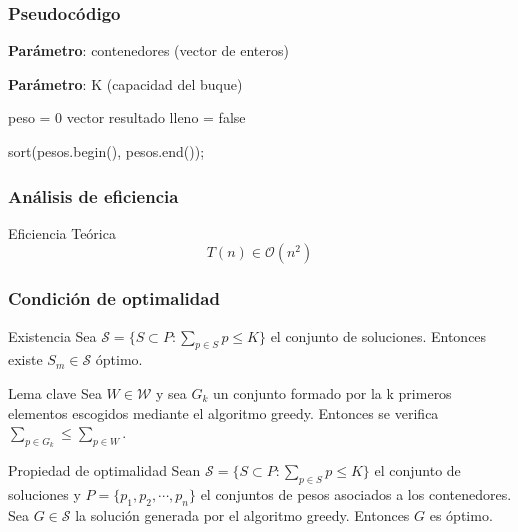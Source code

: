 \documentclass[13pt]{beamer}
\begin{document}
	\begin{frame}
		\frametitle{Pseudocódigo}
		\begin{algorithm}[H]
			\begin{minipage}{0.92\textwidth}
			\textbf{Parámetro}: contenedores (vector de enteros)
		
			\textbf{Parámetro}: K (capacidad del buque)
		
			\end{minipage}
		
			peso = 0\;
			vector resultado\;
			lleno = false\;
		
			sort(pesos.begin(), pesos.end());

			 {
			}

			
		\end{algorithm}
	\end{frame}

	\begin{frame}
		\frametitle{Análisis de eficiencia}
		\begin{block}{Eficiencia Teórica}
			$$T(n) \in \mathcal{O}(n^2)$$
		\end{block}
	\end{frame}

	\begin{frame}
		\frametitle{Condición de optimalidad}

		\begin{block}{Existencia}
			Sea $\mathcal{S} = \{S \subset P : \sum_{p \in S} p \leq K\}$ el conjunto de soluciones. Entonces
			existe $S_m \in \mathcal S$ óptimo. 
		\end{block}

		\begin{alertblock}{Lema clave}
			Sea $W \in \mathcal W$ y sea $G_k$ un conjunto formado
			por la k primeros elementos escogidos mediante el algoritmo greedy. 
			Entonces se verifica $\sum_{p \in G_k} \leq \sum_{p \in W}$. 
		\end{alertblock}

		\begin{alertblock}{Propiedad de optimalidad}
			Sean $\mathcal{S} = \{S \subset P : \sum_{p \in S} p \leq K\}$ el conjunto de soluciones y
			$P = \{p_1,p_2,\cdots,p_n\}$ el conjuntos de pesos asociados
		a los contenedores. 
			Sea $G \in \mathcal S$ la solución generada por el algoritmo greedy. Entonces
			$G$ es óptimo. 
		\end{alertblock}

	\end{frame}
\end{document}
